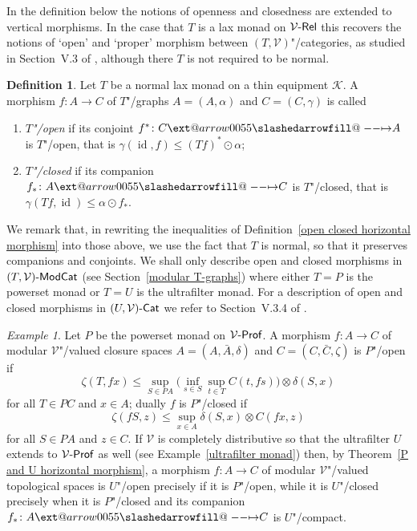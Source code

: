 \documentclass[preprint, a4paper]{elsarticle}
\makeatletter
\def\slashedarrowfill@#1#2#3#4#5{%
  $\m@th\thickmuskip0mu\medmuskip\thickmuskip\thinmuskip\thickmuskip
   \relax#5#1\mkern-7mu%
   \cleaders\hbox{$#5\mkern-2mu#2\mkern-2mu$}\hfill
   \mathclap{#3}\mathclap{#2}%
   \cleaders\hbox{$#5\mkern-2mu#2\mkern-2mu$}\hfill
   \mkern-7mu#4$%
}
\def\rightslashedarrowfill@{%
  \slashedarrowfill@\relbar\relbar\mapstochar\rightarrow}
\newcommand\xslashedrightarrow[2][]{%
  \ext@arrow 0055{\rightslashedarrowfill@}{#1}{#2}}
\def\slashedrightarrow{\xslashedrightarrow{}}
\theoremstyle{definition}
\newtheorem{definition}[theorem]{Definition}
\theoremstyle{remark}
\newtheorem{example}[theorem]{Example}
\providecommand{\defref}[1]{Definition~\ref{#1}}
\providecommand{\exref}[1]{Example~\ref{#1}}
\providecommand{\thmref}[1]{Theorem~\ref{#1}}
\providecommand{\secref}[1]{Section~\ref{#1}}
\providecommand{\tens}{\otimes}
\providecommand{\bigpars}[1]{\bigl(#1\bigr)}
\providecommand{\map}[3]{#1\colon#2\to#3}
\providecommand{\hmap}[3]{#1\colon#2\slashedrightarrow#3}
\DeclareMathOperator{\id}{id}
\providecommand{\catvar}[1]{\mathcal{#1}}
\providecommand{\2}{\mathsf 2}
\providecommand{\K}{\catvar K}
\providecommand{\V}{\catvar V}
\providecommand{\Cat}{\mathsf{Cat}}
\providecommand{\enCat}[1]{#1\text-\Cat}
\providecommand{\Rel}{\mathsf{Rel}}
\providecommand{\enRel}[1]{#1\text-\Rel}
\providecommand{\Prof}{\mathsf{Prof}}
\providecommand{\enProf}[1]{#1\text-\Prof}
\providecommand{\ModCat}[1]{#1\text-\mathsf{ModCat}}
\providecommand{\hc}{\odot}
\makeatother
\begin{document}
	In the definition below the notions of openness and closedness are extended to vertical morphisms. In the case that $T$ is a lax monad on $\enRel\V$ this recovers the notions of `open' and `proper' morphism between $(T, \V)$"/categories, as studied in Section~V.3 of \cite{Hofmann-Seal-Tholen14}, although there $T$ is not required to be normal.
	\begin{definition} \label{open closed vertical morphism}
		Let $T$ be a normal lax monad on a thin equipment $\K$. A morphism $\map fAC$ of $T$"/graphs $A = (A, \alpha)$ and $C = (C, \gamma)$ is called
		\begin{enumerate}[label=-]
			\item \emph{$T$"/open} if its conjoint $\hmap{f^*}CA$ is $T$"/open, that is $\gamma(\id, f) \leq (Tf)^* \hc \alpha$;
			\item \emph{$T$"/closed} if its companion $\hmap{f_*}AC$ is $T$"/closed, that is $\gamma(Tf, \id) \leq \alpha \hc f_*$.
		\end{enumerate}
	\end{definition}
	We remark that, in rewriting the inequalities of \defref{open closed horizontal morphism} into those above, we use the fact that $T$ is normal, so that it preserves companions and conjoints. We shall only describe open and closed morphisms in $\ModCat{(T, \V)}$ (see \secref{modular T-graphs}) where either $T = P$ is the powerset monad or $T = U$ is the ultrafilter monad. For a description of open and closed morphisms in $\enCat{(U, \V)}$ we refer to Section~V.3.4 of \cite{Hofmann-Seal-Tholen14}.
	\begin{example} \label{open/closed maps between modular V-valued closure spaces}
		Let $P$ be the powerset monad on $\enProf\V$. A morphism $\map fAC$ of modular $\V$"/valued closure spaces $A = (A, \bar A, \delta)$ and $C = (C, \bar C, \zeta)$ is $P$"/open if
		\begin{displaymath}
			\zeta(T, fx) \leq \sup_{S \in PA} \bigpars{\inf_{s \in S} \sup_{t \in T} C(t, fs)} \tens \delta(S, x)
		\end{displaymath}
		for all $T \in PC$ and $x \in A$; dually $f$ is $P$"/closed if
		\begin{displaymath}
			\zeta(fS, z) \leq \sup_{x \in A} \delta(S, x) \tens C(fx, z)
		\end{displaymath}
		for all $S \in PA$ and $z \in C$. If $\V$ is completely distributive so that the ultrafilter $U$ extends to $\enProf\V$ as well (see \exref{ultrafilter monad}) then, by \thmref{P and U horizontal morphism}, a morphism $\map fAC$ of modular $\V$"/valued topological spaces is $U$"/open precisely if it is $P$"/open, while it is $U$"/closed precisely when it is $P$"/closed and its companion $\hmap{f_*}AC$ is $U$"/compact.
	\end{example}
\end{document}
